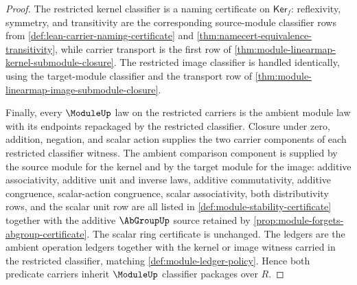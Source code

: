 \begin{proof}
The restricted kernel classifier is a naming certificate on $\mathsf{Ker}_f$: reflexivity, symmetry, and transitivity are the corresponding source-module classifier rows from \autoref{def:lean-carrier-naming-certificate} and \autoref{thm:namecert-equivalence-transitivity}, while carrier transport is the first row of \autoref{thm:module-linearmap-kernel-submodule-closure}. The restricted image classifier is handled identically, using the target-module classifier and the transport row of \autoref{thm:module-linearmap-image-submodule-closure}.

Finally, every $\ModuleUp$ law on the restricted carriers is the ambient module law with its endpoints repackaged by the restricted classifier. Closure under zero, addition, negation, and scalar action supplies the two carrier components of each restricted classifier witness. The ambient comparison component is supplied by the source module for the kernel and by the target module for the image: additive associativity, additive unit and inverse laws, additive commutativity, additive congruence, scalar-action congruence, scalar associativity, both distributivity rows, and the scalar unit row are all listed in \autoref{def:module-stability-certificate} together with the additive $\AbGroupUp$ source retained by \autoref{prop:module-forgets-abgroup-certificate}. The scalar ring certificate is unchanged. The ledgers are the ambient operation ledgers together with the kernel or image witness carried in the restricted classifier, matching \autoref{def:module-ledger-policy}. Hence both predicate carriers inherit $\ModuleUp$ classifier packages over $R$.
\end{proof}

